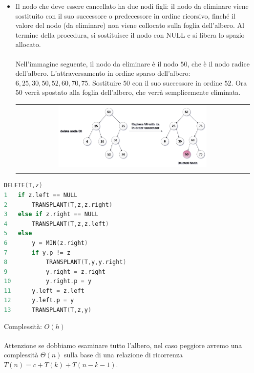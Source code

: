 \begin{itemize}
\begin{center}
\begin{tabular}{c}
        \end{tabular}
    \end{center}
    \item Il nodo che deve essere cancellato ha due nodi figli: il nodo da eliminare viene sostituito con il suo successore o predecessore in ordine ricorsivo, finché il valore del nodo (da eliminare) non viene collocato sulla foglia dell'albero. Al termine della procedura, si sostituisce il nodo con NULL e si libera lo spazio allocato. \\~\\
    Nell'immagine seguente, il nodo da eliminare è il nodo $50$, che è il nodo radice dell'albero. L'attraversamento in ordine sparso dell'albero: $6, 25, 30, 50, 52, 60, 70, 75$. Sostituire $50$ con il suo successore in ordine $52$. Ora $50$ verrà spostato alla foglia dell'albero, che verrà semplicemente eliminata.
    \begin{center}
        \begin{tabular}{c}
            \\ \includegraphics[width=0.65\textwidth]{image/Cancellazione3.png} \\ \\
        \end{tabular}
    \end{center}
\end{itemize}

\begin{mdframed}
\begin{lstlisting}[language=C]
DELETE(T,z)
1   if z.left == NULL
2       TRANSPLANT(T,z,z.right)
3   else if z.right == NULL
4       TRANSPLANT(T,z,z.left)
5   else
6       y = MIN(z.right)
7       if y.p != z
8           TRANSPLANT(T,y,y.right)
9           y.right = z.right
10          y.right.p = y
11      y.left = z.left
12      y.left.p = y
13      TRANSPLANT(T,z,y)
\end{lstlisting}
\end{mdframed}
Complessità: $O(h)$ \\~\\
Attenzione se dobbiamo esaminare tutto l'albero, nel caso peggiore avremo una complessità $\Theta(n)$ sulla base di una relazione di ricorrenza $T(n) = c + T(k) + T(n-k-1)$.

\newpage
